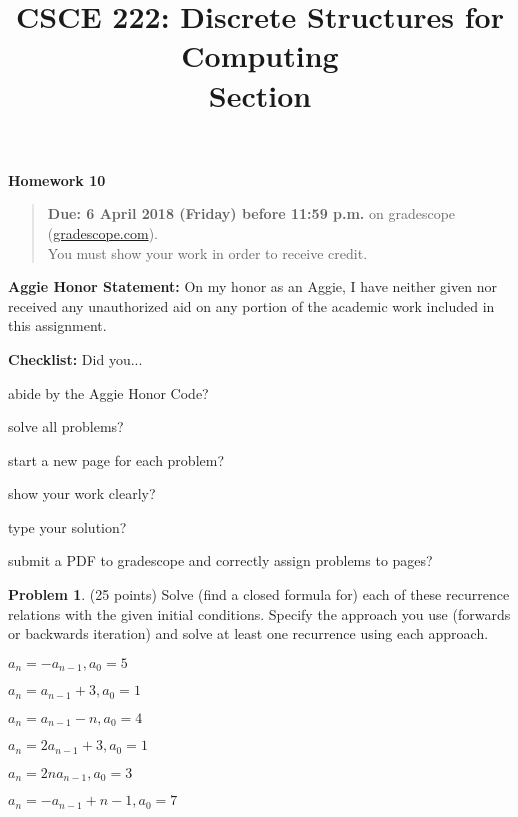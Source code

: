 \documentclass{article}
\title{CSCE 222: Discrete Structures for Computing\\Section \mysectionnumber\\\mysemester}
\author{\myname}
\date{}
\theoremstyle{definition}
\newtheorem{problem}{Problem}
\newcommand{\honor}{\noindent \textbf{Aggie Honor Statement: }On my honor as an Aggie, I have neither
  given nor received any unauthorized aid on any portion of the academic work included in this assignment.
}
\newcommand{\checklist}{\noindent\textbf{Checklist:}
Did you...
\begin{compactenum}
\item abide by the Aggie Honor Code?
\item solve all problems?
\item start a new page for each problem?
\item show your work clearly?
\item type your solution?
\item submit a PDF to gradescope and correctly assign problems to pages?
\end{compactenum}
}
\newcommand{\problemset}[1]{\begin{center}\textbf{Homework #1}\end{center}}
\newcommand{\duedate}[1]{\begin{quote}\textbf{Due: #1} on gradescope (\url{gradescope.com}). \\You must show your work in order to receive credit.\end{quote}}
\newcommand{\homeworknumber}[0]{10}
\begin{document}
\maketitle
\problemset{\homeworknumber}
\duedate{6 April 2018 (Friday) before 11:59 p.m.}
\bigskip

\honor
\bigskip

\checklist

\begin{problem} (25 points)
Solve (find a closed formula for) each of these recurrence relations with the given initial conditions.  Specify the approach you use (forwards or backwards iteration) and solve at least one recurrence using each approach.
 \begin{compactenum}
\renewcommand{\theenumi}{\alph{enumi}}
\item $a_n = -a_{n-1}, a_0 = 5$
\item $a_n = a_{n-1} + 3, a_0 = 1$
\item $a_n = a_{n-1} - n, a_0 = 4$
\item $a_n = 2a_{n-1}+3, a_0 = 1$
\item $a_n = 2na_{n-1}, a_0 = 3$
\item $a_n = -a_{n-1}+n-1, a_0 = 7$
\end{compactenum}
\end{problem}
\end{document}
